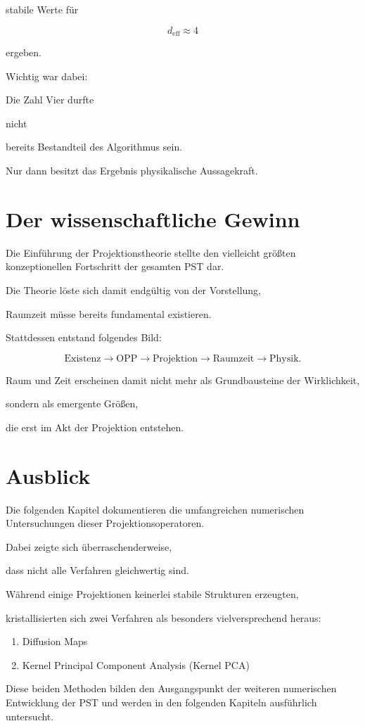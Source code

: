 stabile Werte für

\[
d_{\mathrm{eff}}
\approx
4
\]

ergeben.

Wichtig war dabei:

Die Zahl Vier durfte

nicht

bereits Bestandteil des Algorithmus sein.

Nur dann besitzt das Ergebnis physikalische Aussagekraft.


\section*{Der wissenschaftliche Gewinn}

Die Einführung der Projektionstheorie stellte den vielleicht größten konzeptionellen Fortschritt der gesamten PST dar.

Die Theorie löste sich damit endgültig von der Vorstellung,

Raumzeit müsse bereits fundamental existieren.

Stattdessen entstand folgendes Bild:

\[
\boxed{
\text{Existenz}
\rightarrow
\text{OPP}
\rightarrow
\text{Projektion}
\rightarrow
\text{Raumzeit}
\rightarrow
\text{Physik}.
}
\]

Raum und Zeit erscheinen damit nicht mehr als Grundbausteine der Wirklichkeit,

sondern als emergente Größen,

die erst im Akt der Projektion entstehen.


\section*{Ausblick}

Die folgenden Kapitel dokumentieren die umfangreichen numerischen Untersuchungen dieser Projektionsoperatoren.

Dabei zeigte sich überraschenderweise,

dass nicht alle Verfahren gleichwertig sind.

Während einige Projektionen keinerlei stabile Strukturen erzeugten,

kristallisierten sich zwei Verfahren als besonders vielversprechend heraus:

\begin{enumerate}

\item Diffusion Maps

\item Kernel Principal Component Analysis (Kernel PCA)

\end{enumerate}

Diese beiden Methoden bilden den Ausgangspunkt der weiteren numerischen Entwicklung der PST und werden in den folgenden Kapiteln ausführlich untersucht.

